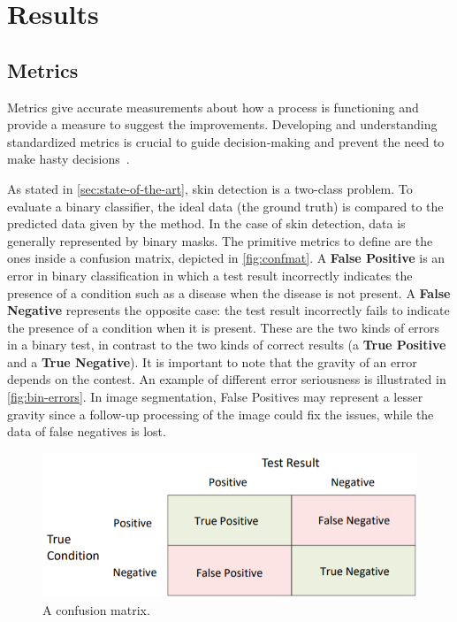 \chapter{Results}\label{chap:results}


\section{Metrics}

Metrics give accurate measurements about how a process is functioning and provide a measure to suggest the improvements.
Developing and understanding standardized metrics is crucial to guide decision-making and prevent the need to make hasty decisions~\cite{austin2021need}.

As stated in \ref{sec:state-of-the-art}, skin detection is a two-class problem.
To evaluate a binary classifier, the ideal data (the ground truth) is compared to the predicted data given by the method.
In the case of skin detection, data is generally represented by binary masks.
The primitive metrics to define are the ones inside a confusion matrix, depicted in \autoref{fig:confmat}.
A \textbf{False Positive} is an error in binary classification in which a test result incorrectly indicates the presence of a condition such as a disease when the disease is not present.
A \textbf{False Negative} represents the opposite case: the test result incorrectly fails to indicate the presence of a condition when it is present.
These are the two kinds of errors in a binary test, in contrast to the two kinds of correct results (a \textbf{True Positive} and a \textbf{True Negative}).
It is important to note that the gravity of an error depends on the contest. %
An example of different error seriousness is illustrated in \autoref{fig:bin-errors}.
In image segmentation, False Positives may represent a lesser gravity since a follow-up processing of the image could fix the issues, while the data of false negatives is lost.

\begin{figure}[h]
    \centering
    \includegraphics[width=0.7\linewidth]{images/results/confmat.png}
    \caption{A confusion matrix.}
    \label{fig:confmat}
\end{figure}

